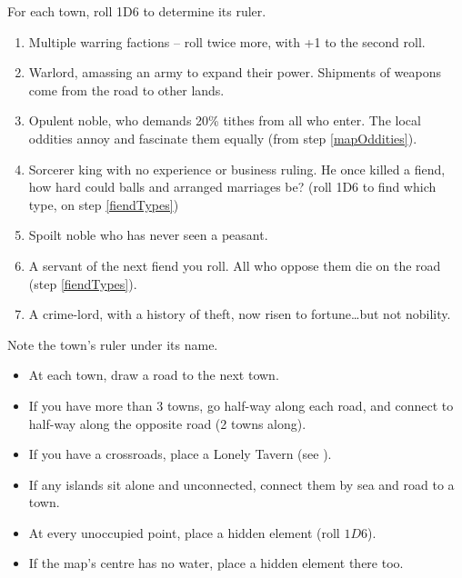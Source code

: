 \begin{multicols}{2}

For each town, roll 1D6 to determine its ruler.

\begin{enumerate}
\item
  Multiple warring factions -- roll twice more, with +1 to the second roll.
\item
  Warlord, amassing an army to expand their power.
  Shipments of weapons come from the road to other lands.
\item
  Opulent noble, who demands 20\% tithes from all who enter.
  The local oddities annoy and fascinate them equally (from step \ref{mapOddities}).
\item
  Sorcerer king with no experience or business ruling.
  He once killed a fiend, how hard could balls and arranged marriages be?
  (roll 1D6 to find which type, on step \ref{fiendTypes})
\item
  Spoilt noble who has never seen a peasant.
\item
  A servant of the next fiend you roll.
  All who oppose them die on the road (step \ref{fiendTypes}).
\item
  A crime-lord, with a history of theft, now risen to fortune\ldots but not nobility.
\end{enumerate}

Note the town's ruler under its name.


\begin{itemize}
\item
  At each town, draw a road to the next town.
\item
  If you have more than 3 towns, go half-way along each road, and
  connect to half-way along the opposite road (2 towns along).
\item
  If you have a crossroads, place a Lonely Tavern (see ).
\item
  If any islands sit alone and unconnected, connect them by sea and road to a town.
\end{itemize}

\label{mapOddities}

\begin{itemize}
  \item
  At every unoccupied point, place a hidden element (roll $1D6$).
  \item
  If the map's centre has no water, place a hidden element there too.
\end{itemize}


\end{multicols}
